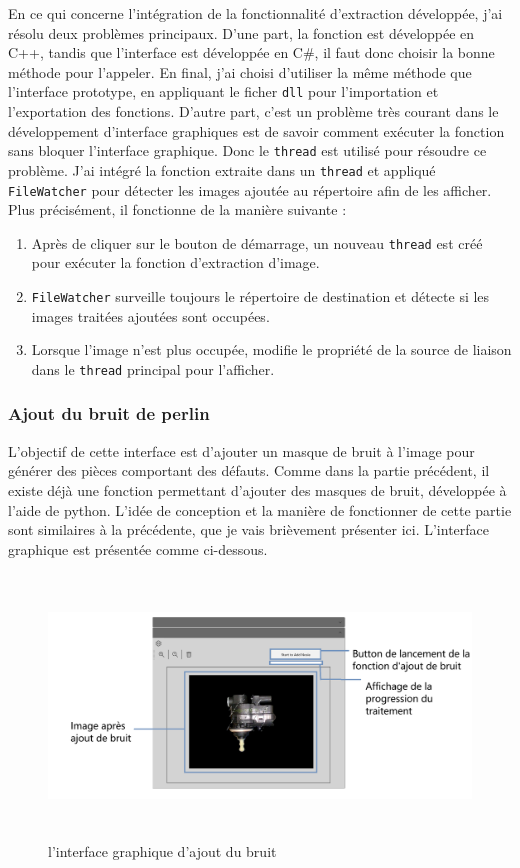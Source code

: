 En ce qui concerne l'intégration de la fonctionnalité d'extraction développée, j'ai résolu deux problèmes principaux. D'une part, la fonction est développée en C++, tandis que l'interface est développée en C\#, il faut donc choisir la bonne méthode pour l'appeler. En final, j'ai choisi d'utiliser la même méthode que l'interface prototype, en appliquant le ficher \texttt{dll} pour l'importation et l'exportation des fonctions. D'autre part, c'est un problème très courant dans le développement d'interface graphiques est de savoir comment exécuter la fonction sans bloquer l'interface graphique. Donc le \texttt{thread} est utilisé pour résoudre ce problème. J'ai intégré la fonction extraite dans un \texttt{thread} et appliqué \texttt{FileWatcher} pour détecter les images ajoutée au répertoire afin de les afficher. Plus précisément, il fonctionne de la manière suivante : 
\begin{enumerate}
    \item Après de cliquer sur le bouton de démarrage, un nouveau \texttt{thread} est créé pour exécuter la fonction d'extraction d'image. 
    \item \texttt{FileWatcher} surveille toujours le répertoire de destination et détecte si les images traitées ajoutées sont occupées.
    \item Lorsque l'image n'est plus occupée, modifie le propriété de la source de liaison dans le \texttt{thread} principal pour l'afficher.
\end{enumerate}

\subsubsection{Ajout du bruit de perlin}
L'objectif de cette interface est d'ajouter un masque de bruit à l'image pour générer des pièces comportant des défauts. Comme dans la partie précédent, il existe déjà une fonction permettant d'ajouter des masques de bruit, développée à l'aide de python. L'idée de conception et la manière de fonctionner de cette partie sont similaires à la précédente, que je vais brièvement présenter ici. L'interface graphique est présentée comme ci-dessous. 
\begin{figure}[H]
    \centering
    \includegraphics[height=7cm]{ressources/images/perlin_noise.png}
    \caption{l'interface graphique d'ajout du bruit}
\end{figure}

